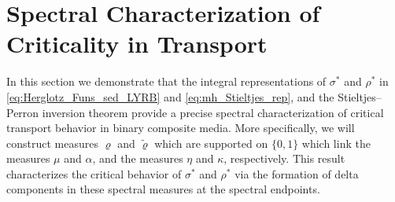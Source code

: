 \documentclass[english,12pt,jmp,graphicx]{revtex4-1}
\begin{document}
\section{Spectral Characterization of Criticality in
  Transport} \label{sec:Measure_Equivalences}   
%
In this section we demonstrate that the integral representations of
$\sigma^*$ and $\rho^*$ in \eqref{eq:Herglotz_Funs_sed_LYRB} and
\eqref{eq:mh_Stieltjes_rep}, and the Stieltjes--Perron inversion
theorem \cite{Henrici:1974:v3} provide a precise spectral
characterization of critical transport behavior in binary composite
media. More specifically, we will construct measures $\varrho$ and
$\tilde{\varrho}$ which are supported on $\{0,1\}$ which link the measures $\mu$
and $\alpha$, and the measures $\eta$ and $\kappa$, respectively. This result
characterizes the critical behavior of $\sigma^*$ and $\rho^*$ via the
formation of delta components in these spectral measures at the
spectral endpoints.  
\end{document}
